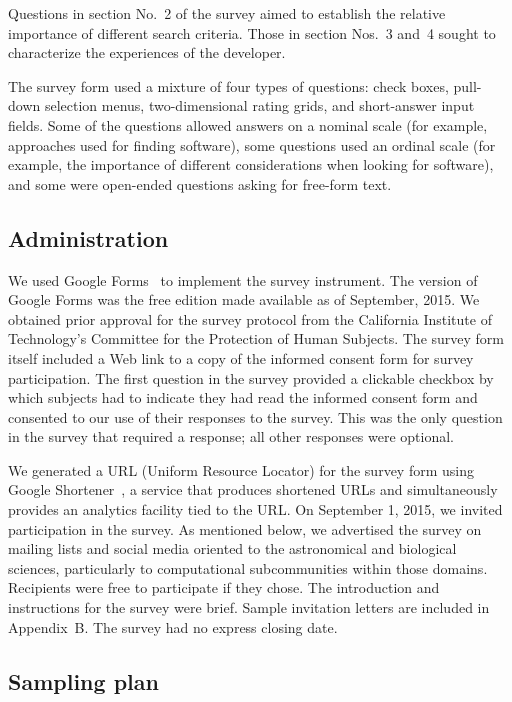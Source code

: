 \documentclass[review]{elsarticle}
\begin{document}
Questions in section No.~2 of the survey aimed to establish the relative importance of different search criteria.  Those in section Nos.~3 and~4 sought to characterize the experiences of the developer.

The survey form used a mixture of four types of questions: check boxes, pull-down selection menus, two-dimensional rating grids, and short-answer input fields.  Some of the questions allowed answers on a nominal scale (for example, approaches used for finding software), some questions used an ordinal scale (for example, the importance of different considerations when looking for software), and some were open-ended questions asking for free-form text.


\subsection{Administration}

We used Google Forms~\citep{googleforms} to implement the survey instrument.  The version of Google Forms was the free edition made available as of September, 2015.  We obtained prior approval for the survey protocol from the California Institute of Technology's Committee for the Protection of Human Subjects.  The survey form itself included a Web link to a copy of the informed consent form for survey participation.  The first question in the survey provided a clickable checkbox by which subjects had to indicate they had read the informed consent form and consented to our use of their responses to the survey.  This was the only question in the survey that required a response; all other responses were optional.

We generated a URL (Uniform Resource Locator) for the survey form using Google Shortener~\citep{googl}, a service that produces shortened URLs and simultaneously provides an analytics facility tied to the URL.  On September 1, 2015, we invited participation in the survey.  As mentioned below, we advertised the survey on mailing lists and social media oriented to the astronomical and biological sciences, particularly to computational subcommunities within those domains.  Recipients were free to participate if they chose.  The introduction and instructions for the survey were brief.  Sample invitation letters are included in Appendix~B.  The survey had no express closing date.


\subsection{Sampling plan}
\label{sampling-plan}
\end{document}
